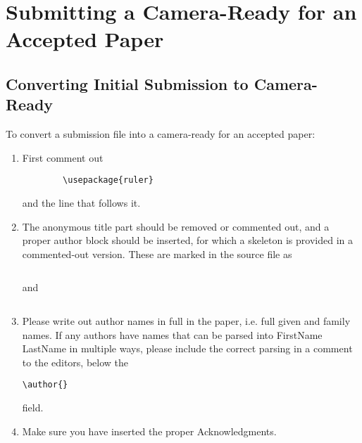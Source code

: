 \documentclass[runningheads]{llncs}
\begin{document}
\section{Submitting a Camera-Ready for an Accepted Paper}
\subsection{Converting Initial Submission to Camera-Ready}
To convert a submission file into a camera-ready for an accepted paper:
\begin{enumerate}
    \item  First comment out \begin{verbatim}
        \usepackage{ruler}
    \end{verbatim} and the line that follows it.
    \item  The anonymous title part should be removed or commented out, and a proper author block should be inserted, for which a skeleton is provided in a commented-out version. These are marked in the source file as \begin{verbatim}
\end{verbatim} and \begin{verbatim}
\end{verbatim}
    \item Please write out author names in full in the paper, i.e. full given and family names. If any authors have names that can be parsed into FirstName LastName in multiple ways, please include the correct parsing in a comment to the editors, below the \begin{verbatim}\author{}\end{verbatim} field.
    \item Make sure you have inserted the proper Acknowledgments.
  \end{enumerate}  
 
\end{document}
